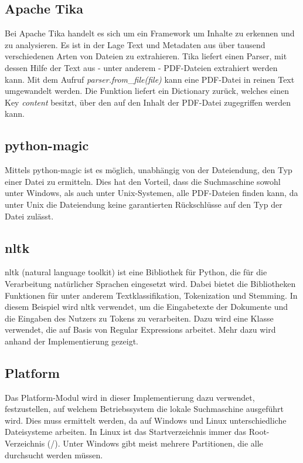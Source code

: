 \subsection{Apache Tika}\label{apache-tika}

Bei Apache Tika handelt es sich um ein Framework um Inhalte zu erkennen und zu analysieren. Es ist in der Lage Text und Metadaten aus über tausend verschiedenen Arten von Dateien zu extrahieren. Tika liefert einen Parser, mit dessen Hilfe der Text aus - unter anderem - PDF-Dateien extrahiert werden kann. Mit dem Aufruf \emph{parser.from}\_\emph{file(file)} kann eine PDF-Datei in reinen Text umgewandelt werden. Die Funktion liefert ein Dictionary zurück, welches einen Key \emph{content} besitzt, über den auf den Inhalt der PDF-Datei zugegriffen werden kann.

\subsection{python-magic}\label{python-magic}

Mittels python-magic ist es möglich, unabhängig von der Dateiendung, den Typ einer Datei zu ermitteln. Dies hat den Vorteil, dass die Suchmaschine sowohl unter Windows, als auch unter Unix-Systemen, alle PDF-Dateien finden kann, da unter Unix die Dateiendung keine garantierten Rückschlüsse auf den Typ der Datei zulässt.

\subsection{nltk}\label{nltk}
nltk (natural language toolkit) ist eine Bibliothek für Python, die für die Verarbeitung natürlicher Sprachen eingesetzt wird. Dabei bietet die Bibliotheken Funktionen für unter anderem Textklassifikation, Tokenization und Stemming.
In diesem Beispiel wird nltk verwendet, um die Eingabetexte der Dokumente und die Eingaben des Nutzers zu Tokens zu verarbeiten. Dazu wird eine Klasse verwendet, die auf Basis von Regular Expressions arbeitet. Mehr dazu wird anhand der Implementierung gezeigt. %

\subsection{Platform}
Das Platform-Modul wird in dieser Implementierung dazu verwendet, festzustellen, auf welchem Betriebssystem die lokale Suchmaschine ausgeführt wird. Dies muss ermittelt werden, da auf Windows und Linux unterschiedliche Dateisysteme arbeiten. In Linux ist das Startverzeichnis immer das Root-Verzeichnis (\glqq /\grqq). Unter Windows gibt meist mehrere Partitionen, die alle durchsucht werden müssen.

